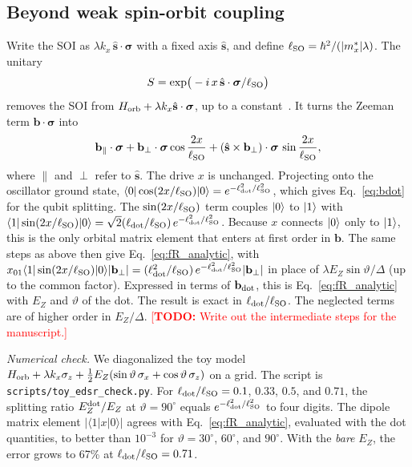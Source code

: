 \documentclass[
  aps,
  reprint,
  amsmath,
  amssymb,
  groupedaddress,
  floatfix,
  longbibliography,
]{revtex4-2}
\newcommand{\todo}[1]{\textcolor{red}{[\textbf{TODO:} #1]}}
\newcommand{\ldot}{\ell_{\rm dot}}
\newcommand{\lso}{\ell_{\rm SO}}
\newcommand{\shat}{\hat{\mathbf s}}
\begin{document}
\subsection{Beyond weak spin-orbit coupling}
Write the SOI as $\lambda k_x\,\shat\cdot\bm\sigma$ with a fixed axis $\shat$, and define $\lso=\hbar^2/(|m_x^*|\lambda)$. The unitary
\begin{align}
S=\exp\!\big(-i\,x\,\shat\cdot\bm\sigma/\lso\big)
\end{align}
removes the SOI from $H_{\rm orb}+\lambda k_x\shat\cdot\bm\sigma$, up to a constant~\cite{flindt2006spin}. It turns the Zeeman term $\mathbf{b}\cdot\bm\sigma$ into
\begin{align}
\mathbf{b}_\parallel\cdot\bm\sigma
+
\mathbf{b}_\perp\cdot\bm\sigma\cos\frac{2x}{\lso}
+
(\shat\times\mathbf{b}_\perp)\cdot\bm\sigma\,\sin\frac{2x}{\lso},
\end{align}
where $\parallel$ and $\perp$ refer to $\shat$. The drive $x$ is unchanged. Projecting onto the oscillator ground state, $\langle0|\cos(2x/\lso)|0\rangle=e^{-\ldot^2/\lso^2}$, which gives Eq.~\eqref{eq:bdot} for the qubit splitting. The $\sin(2x/\lso)$ term couples $\ket0$ to $\ket1$ with $\langle1|\sin(2x/\lso)|0\rangle=\sqrt2(\ldot/\lso)\,e^{-\ldot^2/\lso^2}$. Because $x$ connects $\ket0$ only to $\ket1$, this is the only orbital matrix element that enters at first order in $\mathbf{b}$. The same steps as above then give Eq.~\eqref{eq:fR_analytic}, with $x_{01}\langle1|\sin(2x/\lso)|0\rangle|\mathbf{b}_\perp|=(\ldot^2/\lso)\,e^{-\ldot^2/\lso^2}|\mathbf{b}_\perp|$ in place of $\lambda E_Z\sin\vartheta/\Delta$ (up to the common factor). Expressed in terms of $\mathbf{b}_{\rm dot}$, this is Eq.~\eqref{eq:fR_analytic} with $E_Z$ and $\vartheta$ of the dot. The result is exact in $\ldot/\lso$. The neglected terms are of higher order in $E_Z/\Delta$.
\todo{Write out the intermediate steps for the manuscript.}

\emph{Numerical check.} We diagonalized the toy model $H_{\rm orb}+\lambda k_x\sigma_z+\tfrac12E_Z(\sin\vartheta\,\sigma_x+\cos\vartheta\,\sigma_z)$ on a grid. The script is \texttt{scripts/toy\_edsr\_check.py}. For $\ldot/\lso=0.1$, $0.33$, $0.5$, and $0.71$, the splitting ratio $E_Z^{\rm dot}/E_Z$ at $\vartheta=90^\circ$ equals $e^{-\ldot^2/\lso^2}$ to four digits. The dipole matrix element $|\langle1|x|0\rangle|$ agrees with Eq.~\eqref{eq:fR_analytic}, evaluated with the dot quantities, to better than $10^{-3}$ for $\vartheta=30^\circ$, $60^\circ$, and $90^\circ$. With the \emph{bare} $E_Z$, the error grows to 67\% at $\ldot/\lso=0.71$.
\end{document}
